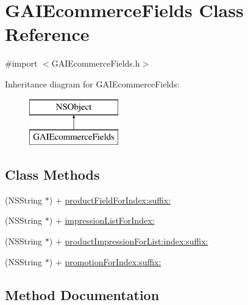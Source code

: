 \hypertarget{interface_g_a_i_ecommerce_fields}{}\section{G\+A\+I\+Ecommerce\+Fields Class Reference}
\label{interface_g_a_i_ecommerce_fields}


{\ttfamily \#import $<$G\+A\+I\+Ecommerce\+Fields.\+h$>$}

Inheritance diagram for G\+A\+I\+Ecommerce\+Fields\+:\begin{figure}[H]
\begin{center}
\leavevmode
\includegraphics[height=2.000000cm]{interface_g_a_i_ecommerce_fields}
\end{center}
\end{figure}
\subsection*{Class Methods}
\begin{DoxyCompactItemize}
\item 
(N\+S\+String $\ast$) + \hyperlink{interface_g_a_i_ecommerce_fields_a09a834b91ffa68556617e00b2309c803}{product\+Field\+For\+Index\+:suffix\+:}
\item 
(N\+S\+String $\ast$) + \hyperlink{interface_g_a_i_ecommerce_fields_aaab6111471fbe72069dd21f1ae550340}{impression\+List\+For\+Index\+:}
\item 
(N\+S\+String $\ast$) + \hyperlink{interface_g_a_i_ecommerce_fields_a4004413f22575b6d5de39cdc0a9b8129}{product\+Impression\+For\+List\+:index\+:suffix\+:}
\item 
(N\+S\+String $\ast$) + \hyperlink{interface_g_a_i_ecommerce_fields_a67b530cdd0f8ce34c6bec5c4d9f17311}{promotion\+For\+Index\+:suffix\+:}
\end{DoxyCompactItemize}


\subsection{Method Documentation}
\mbox{\label{interface_g_a_i_ecommerce_fields_aaab6111471fbe72069dd21f1ae550340}} 
